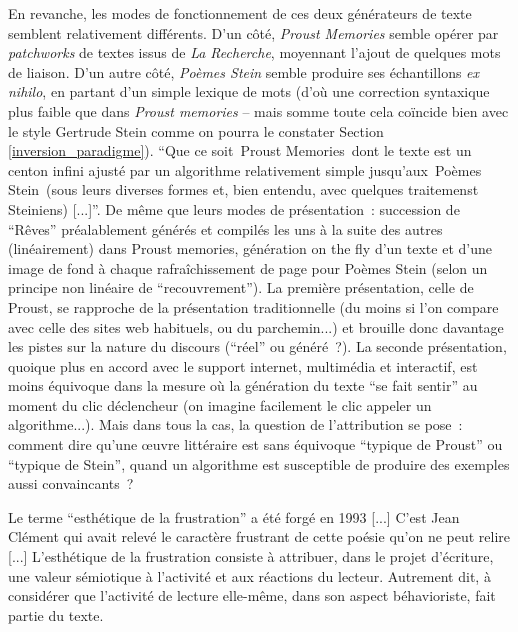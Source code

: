 \documentclass{article}
\newenvironment{citationbox}
{\begin{center}
		\begin{minipage}{.8\textwidth}
		}
		{
		\end{minipage}	
\end{center}
}
\begin{document}
				En revanche, les modes de fonctionnement de ces deux générateurs de texte semblent relativement différents. D'un côté, \textit{Proust Memories} semble opérer par \textit{patchworks} de textes issus de \textit{La Recherche}, moyennant l'ajout de quelques mots de liaison. D'un autre côté, \textit{Poèmes Stein} semble produire ses échantillons \textit{ex nihilo}, en partant d'un simple lexique de mots (d'où une correction syntaxique plus faible que dans \textit{Proust memories} -- mais somme toute cela coïncide bien avec le style Gertrude Stein comme on pourra le constater Section \ref{inversion_paradigme}). ``Que ce soit Proust Memories dont le texte est un centon infini ajusté par un algorithme relativement simple jusqu'aux Poèmes Stein (sous leurs diverses formes et, bien entendu, avec quelques traitemenst Steiniens) [...]''. De même que leurs modes de présentation : succession de ``Rêves'' préalablement générés et compilés les uns à la suite des autres (linéairement) dans Proust memories, génération on the fly d'un texte et d'une image de fond à chaque rafraîchissement de page pour Poèmes Stein (selon un principe non linéaire de ``recouvrement''). La première présentation, celle de Proust, se rapproche de la présentation traditionnelle (du moins si l'on compare avec celle des sites web habituels, ou du parchemin...) et brouille donc davantage les pistes sur la nature du discours (``réel'' ou généré ?). La seconde présentation, quoique plus en accord avec le support internet, multimédia et interactif, est moins équivoque dans la mesure où la génération du texte ``se fait sentir'' au moment du clic déclencheur (on imagine facilement le clic appeler un algorithme...). Mais dans tous la cas, la question de l'attribution se pose : comment dire qu'une œuvre littéraire est sans équivoque ``typique de Proust'' ou ``typique de Stein'', quand un algorithme est susceptible de produire des exemples aussi convaincants ?
				
				\begin{citationbox}
					Le terme ``esthétique de la frustration'' a été forgé en 1993 [...] C’est Jean Clément qui avait
					relevé le caractère frustrant de cette poésie qu’on ne peut relire [...] L’esthétique de
					la frustration consiste à attribuer, dans le projet d’écriture, une valeur sémiotique à l’activité et
					aux réactions du lecteur. Autrement dit, à considérer que l’activité de lecture elle-même, dans
					son aspect béhavioriste, fait partie du texte. 
				\end{citationbox}
				
\end{document}

